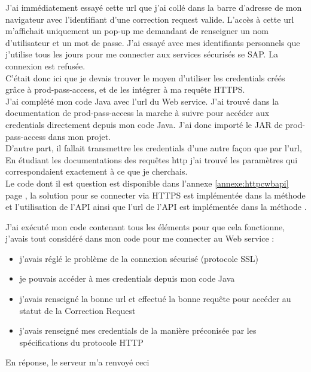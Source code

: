 J'ai immédiatement essayé cette url que j'ai collé dans la barre d'adresse de mon navigateur avec l'identifiant d'une correction request valide. L'accès à cette url m'affichait uniquement un pop-up me demandant de renseigner un nom d'utilisateur et un mot de passe. J'ai essayé avec mes identifiants personnels que j'utilise tous les jours pour me connecter aux services sécurisés se SAP. La connexion est refusée.\\
C'était donc ici que je devais trouver le moyen d'utiliser les credentials créés grâce à prod-pass-access, et de les intégrer à ma requête HTTPS.\\
J'ai complété mon code \gls{Java} avec l'url du \gls{Web service}. J'ai trouvé dans la documentation de prod-pass-access la marche à suivre pour accéder aux credentials directement depuis mon code \gls{Java}. J'ai donc importé le \gls{JAR} de prod-pass-access dans mon projet.\\
D'autre part, il fallait transmettre les credentials d'une autre façon que par l'url, En étudiant les documentations des requêtes http j'ai trouvé les paramètres qui correspondaient exactement à ce que je cherchais.\\
Le code dont il est question est disponible dans l'annexe \ref{annexe:httpcwbapi} page \pageref{annexe:httpcwbapi}, la solution pour se connecter via HTTPS est implémentée dans la méthode  et l'utilisation de l'API ainsi que l'url de l'\gls{API}  est implémentée dans la méthode .

J'ai exécuté mon code contenant tous les éléments pour que cela fonctionne, j'avais tout considéré dans mon code pour me connecter au \gls{Web service} :
\begin{itemize}
	\item j'avais réglé le problème de la connexion sécurisé (protocole SSL)
	\item je pouvais accéder à mes credentials depuis mon code \gls{Java}
	\item j'avais renseigné la bonne url et effectué la bonne requête pour accéder au statut de la Correction Request
	\item j'avais renseigné mes credentials de la manière préconisée par les spécifications du protocole HTTP
\end{itemize}


En réponse, le serveur m'a renvoyé ceci \\

